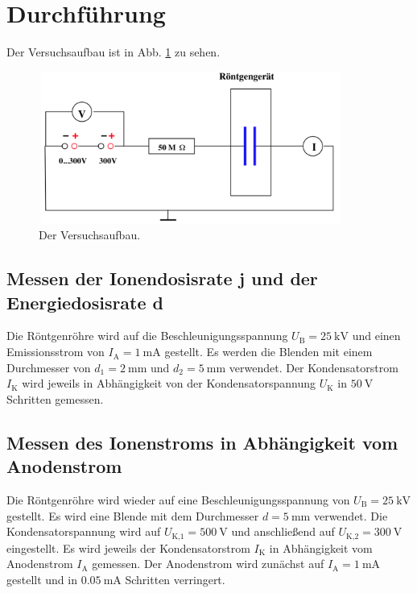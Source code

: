 \section{Durchführung}
\label{sec:Durchführung}

Der Versuchsaufbau ist in Abb. \ref{fig:aufbau} zu sehen.
\begin{figure}
    \centering
    \includegraphics[width=10cm, height=5cm]{build/aufbau.png}
    \caption{Der Versuchsaufbau. \cite{V607}}
    \label{fig:aufbau}
\end{figure}

\subsection{Messen der Ionendosisrate j und der Energiedosisrate d}
Die Röntgenröhre wird auf die Beschleunigungsspannung
$U_\text{B} = \SI{25}{\kilo\volt}$ und einen Emissionsstrom 
von $I_\text{A} = \SI{1}{\milli\ampere}$ gestellt.
Es werden die Blenden mit einem Durchmesser von
$d_1 = \SI{2}{\milli\meter}$ und $d_2 = \SI{5}{\milli\meter}$ 
verwendet.
\newline
Der Kondensatorstrom $I_\text{K}$ wird jeweils in Abhängigkeit
von der Kondensatorspannung $U_\text{K}$ in $\SI{50}{\volt}$ 
Schritten gemessen.

\subsection{Messen des Ionenstroms in Abhängigkeit vom Anodenstrom}
Die Röntgenröhre wird wieder auf eine Beschleunigungsspannung von
$U_\text{B} = \SI{25}{\kilo\volt}$ gestellt. Es wird eine
Blende mit dem Durchmesser $d = \SI{5}{\milli\meter}$
verwendet. Die Kondensatorspannung wird auf 
$U_\text{K,1} = \SI{500}{\volt}$ und anschließend auf
$U_\text{K,2} = \SI{300}{\volt}$ eingestellt.
\newline
Es wird jeweils der Kondensatorstrom $I_\text{K}$ in
Abhängigkeit vom Anodenstrom $I_\text{A}$ gemessen.
Der Anodenstrom wird zunächst auf $I_\text{A} = \SI{1}{\milli\ampere}$
gestellt und in $\SI{0.05}{\milli\ampere}$ Schritten verringert.

